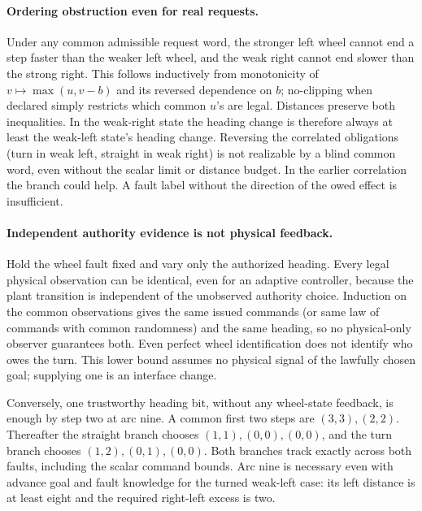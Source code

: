 \documentclass{article}
\begin{document}
\paragraph{Ordering obstruction even for real requests.}
Under any common admissible request word, the stronger left wheel
cannot end a step faster than the weaker left wheel, and the weak
right cannot end slower than the strong right. This follows inductively
from monotonicity of \(v\mapsto \max(u,v-b)\) and its reversed
dependence on \(b\); no-clipping when declared simply restricts
which common \(u\)'s are legal. Distances preserve both inequalities.
In the weak-right state the heading change is therefore always at
least the weak-left state's heading change. Reversing the correlated
obligations (turn in weak left, straight in weak right) is not
realizable by a blind common word, even without the scalar limit
or distance budget. In the earlier correlation the branch could help.
A fault label without the direction of the owed effect is insufficient.

\paragraph{Independent authority evidence is not physical feedback.}
Hold the wheel fault fixed and vary only the authorized heading.
Every legal physical observation can be identical, even for an
adaptive controller, because the plant transition is independent
of the unobserved authority choice. Induction on the common
observations gives the same issued commands (or same law of commands
with common randomness) and the same heading, so no physical-only
observer guarantees both. Even perfect wheel identification does
not identify who owes the turn. This lower bound assumes no
physical signal of the lawfully chosen goal; supplying one is an
interface change.

Conversely, one trustworthy heading bit, without any wheel-state
feedback, is enough by step two at arc nine. A common first two
steps are \((3,3),(2,2)\). Thereafter the straight branch chooses
\((1,1),(0,0),(0,0)\), and the turn branch chooses
\((1,2),(0,1),(0,0)\). Both branches track exactly across both
faults, including the scalar command bounds. Arc nine is necessary
even with advance goal and fault knowledge for the turned weak-left
case: its left distance is at least eight and the required
right-left excess is two.
\end{document}
